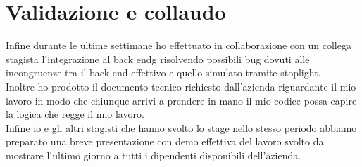\section{Validazione e collaudo}

Infine durante le ultime settimane ho effettuato in collaborazione con un collega stagista l'integrazione al \gls{back endg} risolvendo possibili bug dovuti alle incongruenze tra il back end effettivo e quello simulato tramite stoplight.\\
Inoltre ho prodotto il documento tecnico richiesto dall'azienda riguardante il mio lavoro in modo che chiunque arrivi a prendere in mano il mio codice possa capire la logica che regge il mio lavoro.\\
Infine io e gli altri stagisti che hanno svolto lo stage nello stesso periodo abbiamo preparato una breve presentazione con demo effettiva del lavoro svolto da mostrare l'ultimo giorno a tutti i dipendenti disponibili dell'azienda.
